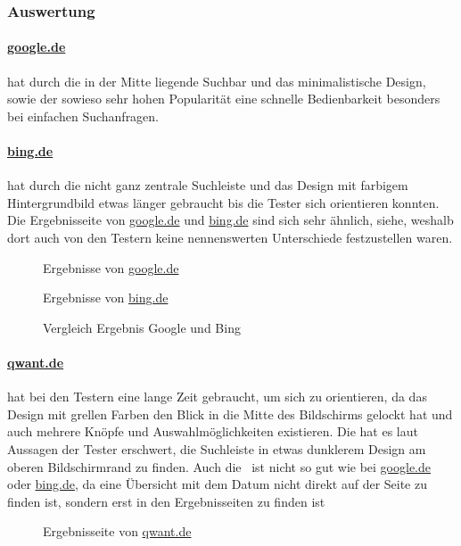 \subsubsection*{Auswertung}
\paragraph{\url{google.de}}
hat durch die in der Mitte liegende Suchbar und das minimalistische Design,
sowie der sowieso sehr hohen Popularität eine schnelle Bedienbarkeit besonders bei einfachen Suchanfragen.\\

\paragraph{\url{bing.de}} hat durch die nicht ganz zentrale Suchleiste und das Design mit farbigem Hintergrundbild etwas länger gebraucht bis die Tester sich orientieren konnten.
Die Ergebnisseite von \url{google.de} und \url{bing.de} sind sich sehr ähnlich, siehe, weshalb dort auch von den Testern keine nennenswerten Unterschiede festzustellen waren.\\
\begin{figure}
    \centering
    \begin{minipage}[t]{0.45\linewidth}
        \centering
        Ergebnisse von \url{google.de}
    \end{minipage}%
    \hfill\vrule\hfill
    \begin{minipage}[t]{0.45\linewidth}
        \centering
        Ergebnisse von \url{bing.de}
    \end{minipage}
    \caption{Vergleich Ergebnis Google und Bing}\label{fig:tag_des_internets_results}
\end{figure}

\paragraph{\url{qwant.de}} hat bei den Testern eine lange Zeit gebraucht, um sich zu orientieren,
da das Design mit grellen Farben den Blick in die Mitte des Bildschirms gelockt hat und auch mehrere Knöpfe und Auswahlmöglichkeiten existieren.
Die hat es laut Aussagen der Tester erschwert, die Suchleiste in etwas dunklerem Design am oberen Bildschirmrand zu finden.
Auch die~ ist nicht so gut wie bei \url{google.de} oder \url{bing.de},
da eine Übersicht mit dem Datum nicht direkt auf der Seite zu finden ist,
sondern erst in den Ergebnisseiten zu finden ist
\begin{figure}
    \centering
    \caption{Ergebnisseite von \url{qwant.de}}\label{fig:qwant_tag_des_internets_results}
\end{figure}

